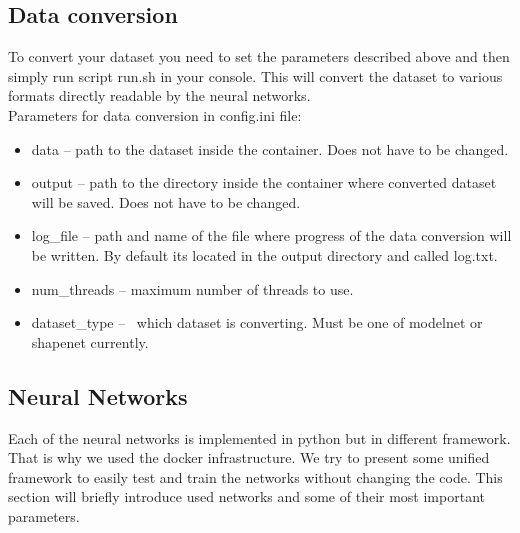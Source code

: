 \subsection{Data conversion}
To convert your dataset you need to set the parameters described above and then simply run script run.sh in your console. This will convert the dataset to various formats directly readable by the neural networks.\\
Parameters for data conversion in config.ini file:
\begin{itemize}
	\item  {data -- path to the dataset inside the container. Does not have to be changed.}
	\item{output -- path to the directory inside the container where converted dataset will be saved. Does not have to be changed.}
	\item{log\_file -- path and name of the file where progress of the data conversion will be written. By default its located in the output directory and called log.txt.}
	\item{num\_threads -- maximum number of threads to use.}
	\item{dataset\_type --  which dataset is converting. Must be one of modelnet or shapenet currently.}
\end{itemize}

\subsection{Neural Networks}
Each of the neural networks is implemented in python but in different framework. That is why we used the docker infrastructure. We try to present some unified framework to easily test and train the networks without changing the code. This section will briefly introduce used networks and some of their most important parameters.\\

